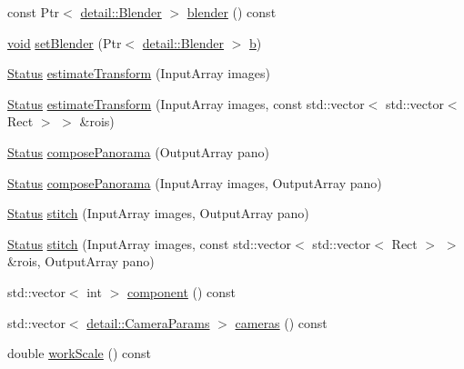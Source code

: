 \begin{DoxyCompactItemize}
\item 
const Ptr$<$ \hyperlink{classcv_1_1detail_1_1Blender}{detail\-::\-Blender} $>$ \hyperlink{classcv_1_1Stitcher_a66b6312615f2d5580a784a0332f656ca}{blender} () const 
\item 
\hyperlink{legacy_8hpp_a8bb47f092d473522721002c86c13b94e}{void} \hyperlink{classcv_1_1Stitcher_a79651cf9e4b87cb6af26caa0535b9baa}{set\-Blender} (Ptr$<$ \hyperlink{classcv_1_1detail_1_1Blender}{detail\-::\-Blender} $>$ \hyperlink{legacy_8hpp_ac04272e8ca865b8fba18d36edae9fd2a}{b})
\item 
\hyperlink{classcv_1_1Stitcher_a507409ce9435dd89857469d12ec06b45}{Status} \hyperlink{classcv_1_1Stitcher_a0d516fbd44e52fd03a297c6eacdfe252}{estimate\-Transform} (Input\-Array images)
\item 
\hyperlink{classcv_1_1Stitcher_a507409ce9435dd89857469d12ec06b45}{Status} \hyperlink{classcv_1_1Stitcher_a423f7e1163a3da67ce75aeb65d61fb80}{estimate\-Transform} (Input\-Array images, const std\-::vector$<$ std\-::vector$<$ Rect $>$ $>$ \&rois)
\item 
\hyperlink{classcv_1_1Stitcher_a507409ce9435dd89857469d12ec06b45}{Status} \hyperlink{classcv_1_1Stitcher_a3217156f7deba256ecd7790ef34008ed}{compose\-Panorama} (Output\-Array pano)
\item 
\hyperlink{classcv_1_1Stitcher_a507409ce9435dd89857469d12ec06b45}{Status} \hyperlink{classcv_1_1Stitcher_a90667e9e2ccaf0c3063eb2ca2285a4d1}{compose\-Panorama} (Input\-Array images, Output\-Array pano)
\item 
\hyperlink{classcv_1_1Stitcher_a507409ce9435dd89857469d12ec06b45}{Status} \hyperlink{classcv_1_1Stitcher_af83fb6a8a322b00e8a0e449cbf20c825}{stitch} (Input\-Array images, Output\-Array pano)
\item 
\hyperlink{classcv_1_1Stitcher_a507409ce9435dd89857469d12ec06b45}{Status} \hyperlink{classcv_1_1Stitcher_ac5185e4a70c44944ef4f806de0d1abb1}{stitch} (Input\-Array images, const std\-::vector$<$ std\-::vector$<$ Rect $>$ $>$ \&rois, Output\-Array pano)
\item 
std\-::vector$<$ int $>$ \hyperlink{classcv_1_1Stitcher_a34080e12d8c1128edf61212d346768d7}{component} () const 
\item 
std\-::vector$<$ \hyperlink{structcv_1_1detail_1_1CameraParams}{detail\-::\-Camera\-Params} $>$ \hyperlink{classcv_1_1Stitcher_ab61f53146e30dd18c35f043c3b5f374c}{cameras} () const 
\item 
double \hyperlink{classcv_1_1Stitcher_a09ef85d558424aecec670e2977e17c0b}{work\-Scale} () const 
\end{DoxyCompactItemize}
